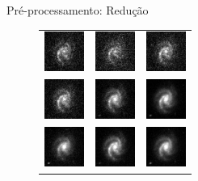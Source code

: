 \documentclass[10pt,xcolor=svgnames]{beamer}
\begin{document}
\begin{frame}{Pré-processamento: Redução}
  \vspace{2mm}
  \begin{minipage}{0.48\textwidth}
    \begin{figure}
      \begin{tabular}{ccc}
        \includegraphics[width=13mm]{imgs/F378.png} &
        \includegraphics[width=13mm]{imgs/F395.png} &
        \includegraphics[width=13mm]{imgs/F410.png}   \\
        \includegraphics[width=13mm]{imgs/F430.png} &
        \includegraphics[width=13mm]{imgs/F515.png} &
        \includegraphics[width=13mm]{imgs/F660.png}   \\
        \includegraphics[width=13mm]{imgs/F861.png} &
        \includegraphics[width=13mm]{imgs/G.png}    &
        \includegraphics[width=13mm]{imgs/I.png}      \\

\end{tabular}
\end{figure}
\end{minipage}
\end{frame}
\end{document}
